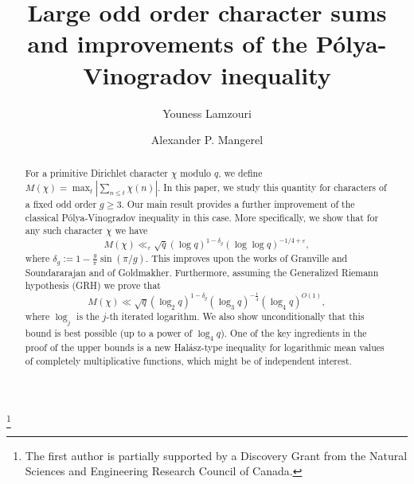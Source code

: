 \documentclass[12pt]{amsart}
\theoremstyle{definition}
\numberwithin{equation}{section}
\begin{document}
\baselineskip=17pt



\title[Large odd order character sums]{Large odd order character sums and improvements of the P\'{o}lya-Vinogradov inequality}



\author{Youness Lamzouri}

\author{Alexander P.  Mangerel}


\address{Department of Mathematics and Statistics,
York University,
4700 Keele Street,
Toronto, ON,
M3J1P3
Canada}


\address{Department of Mathematics\\ University of Toronto\\
Toronto, Ontario, Canada}


\date{}


\begin{abstract}  
For a primitive Dirichlet character $\chi$ modulo $q$, we define $M(\chi)=\max_{t } |\sum_{n \leq t} \chi(n)|$. In this paper, we study this quantity for characters of a fixed odd order $g\geq 3$. Our main result provides a further improvement of the classical P\'{o}lya-Vinogradov inequality in this case. More specifically, we show that for any such character $\chi$ we have
$$M(\chi)\ll_{\varepsilon} \sqrt{q}(\log q)^{1-\delta_g}(\log\log q)^{-1/4+\varepsilon},$$
where $\delta_g := 1-\frac{g}{\pi}\sin(\pi/g)$. This 
improves upon the works of Granville and Soundararajan and of Goldmakher. Furthermore, assuming the Generalized Riemann hypothesis (GRH) we prove that
$$
M(\chi) \ll \sqrt{q} \left(\log_2 q\right)^{1-\delta_g} \left(\log_3 q\right)^{-\frac{1}{4}}\left(\log_4 q\right)^{O(1)},
$$
where $\log_j$ is the $j$-th iterated logarithm. We also show unconditionally that this bound is best possible (up to a power of $\log_4 q$). One of the key ingredients in the proof of the upper bounds is a new Hal\'asz-type inequality for logarithmic mean values of completely multiplicative functions, which might be of independent interest.
\end{abstract}


\thanks{The first author is partially supported by a Discovery Grant from the Natural Sciences and Engineering Research Council of Canada.}


\maketitle
\end{document}
